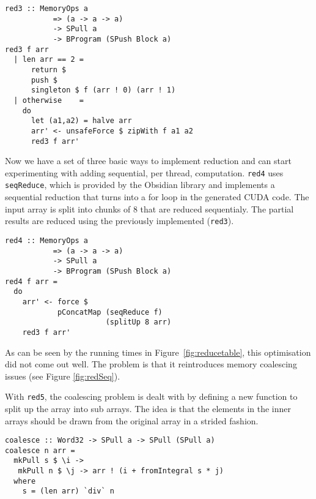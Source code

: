 \begin{small} 
\begin{Verbatim}[samepage = true] 
red3 :: MemoryOps a
           => (a -> a -> a)
           -> SPull a
           -> BProgram (SPush Block a)
red3 f arr
  | len arr == 2 = 
      return $ 
      push $ 
      singleton $ f (arr ! 0) (arr ! 1) 
  | otherwise    = 
    do
      let (a1,a2) = halve arr
      arr' <- unsafeForce $ zipWith f a1 a2
      red3 f arr'
\end{Verbatim}
\end{small}



Now we have a set of three basic ways to implement reduction  and can start experimenting with adding 
sequential, per thread, computation. {\tt red4} uses
{\tt seqReduce}, which is provided by the Obsidian library and 
implements a sequential reduction that turns into a for loop in the generated 
CUDA code. The input array is split into 
chunks of 8 that are reduced sequentialy. The partial
results are reduced using the previously implemented ({\tt red3}). 

\begin{small}
\begin{Verbatim}[samepage = true] 
red4 :: MemoryOps a
           => (a -> a -> a)
           -> SPull a
           -> BProgram (SPush Block a)
red4 f arr =
  do
    arr' <- force $  
            pConcatMap (seqReduce f) 
                       (splitUp 8 arr)
    red3 f arr' 
\end{Verbatim}
\end{small}%

As can be seen by the running times in Figure~\ref{fig:reducetable}, this optimisation 
did not come out well. The problem is that it reintroduces memory coalescing issues (see Figure \ref{fig:redSeq}). 


With {\tt red5}, the coalescing problem is dealt with by defining a new 
function to split up the array into sub arrays. The idea is that the 
elements in the inner arrays should be drawn from the original array in a strided fashion. 

\begin{small} 
\begin{Verbatim}[samepage = true] 
coalesce :: Word32 -> SPull a -> SPull (SPull a)
coalesce n arr =
  mkPull s $ \i ->
   mkPull n $ \j -> arr ! (i + fromIntegral s * j)
  where
    s = (len arr) `div` n 
\end{Verbatim}
\end{small}

